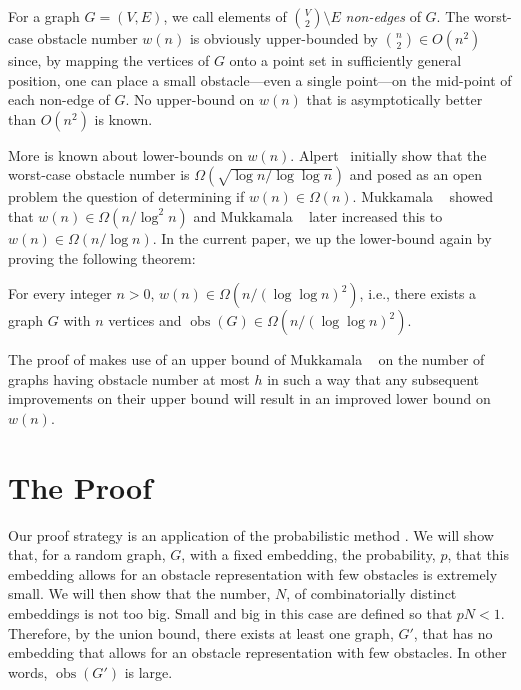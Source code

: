 \documentclass{patmorin}
\DeclareMathOperator{\obs}{obs}
\begin{document}
For a graph $G=(V,E)$, we call elements of $\binom{V}{2}\setminus E$
\emph{non-edges} of $G$.  The worst-case obstacle number $w(n)$ is
obviously upper-bounded by $\binom{n}{2}\in O(n^2)$ since, by mapping
the vertices of $G$ onto a point set in sufficiently general position,
one can place a small obstacle---even a single point---on the mid-point
of each non-edge of $G$.  No upper-bound on $w(n)$ that is asymptotically
better than $O(n^2)$ is known.

More is known about lower-bounds on $w(n)$.  Alpert \etal\
initially show that the worst-case obstacle number is
$\Omega(\sqrt{\log n/\log\log n})$ and posed as an open problem the question
of determining if $w(n)\in\Omega(n)$.
Mukkamala \etal\ \cite{mukkamala.pach.ea:graphs} showed that $w(n)\in
\Omega(n/\log^2 n)$ and Mukkamala \etal\ \cite{mukkamala.pach.ea:lower}
later increased this to $w(n)\in\Omega(n/\log n)$.  In the current paper,
we up the lower-bound again by proving the following theorem:
\begin{thm}
  For every integer $n>0$, $w(n)\in\Omega(n/(\log\log n)^2)$, i.e., there
  exists a graph $G$ with $n$ vertices and $\obs(G)\in\Omega(n/(\log\log
  n)^2)$.
\end{thm}

The proof of  makes use of an upper bound of Mukkamala \etal\
\cite[Theorem~1]{mukkamala.pach.ea:lower} on the number of graphs having
obstacle number at most $h$ in such a way that any subsequent improvements
on their upper bound will result in an improved lower bound on $w(n)$.

\section{The Proof}

Our proof strategy is an application of the probabilistic method
\cite{alon.spencer:probabilistic}.  We will show that, for a random graph,
$G$, with a fixed embedding, the probability, $p$, that this embedding
allows for an obstacle representation with few obstacles is extremely
small.  We will then show that the number, $N$, of combinatorially
distinct embeddings is not too big.  Small and big in this case are
defined so that $pN < 1$.  Therefore, by the union bound, there exists at
least one graph, $G'$, that has no embedding that allows for an obstacle
representation with few obstacles.  In other words, $\obs(G')$ is large.
\end{document}
